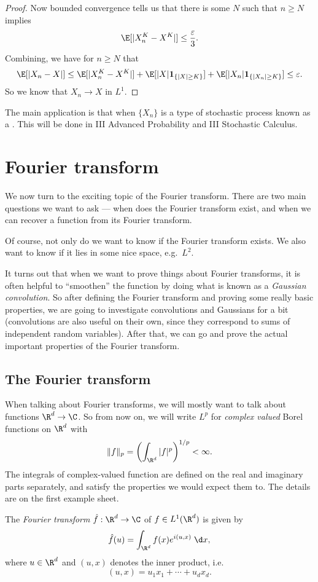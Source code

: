 \documentclass[a4paper]{article}
\begin{document}
\begin{proof}
  Now bounded convergence tells us that there is some $N$ such that $n \geq N$ implies
  \[
    \E[|X_n^K - X^K|] \leq \frac{\varepsilon}{3}.
  \]
  Combining, we have for $n \geq N$ that
  \[
    \E[|X_n - X|] \leq \E[|X_n^K - X^K|] + \E[|X|\mathbf{1}_{\{|X| \geq K\}}] + \E[|X_n|\mathbf{1}_{\{|X_n| \geq K\}}] \leq \varepsilon.
  \]
  So we know that $X_n \to X$ in $L^1$.
\end{proof}

The main application is that when $\{X_n\}$ is a type of stochastic process known as a . This will be done in III Advanced Probability and III Stochastic Calculus.

\section{Fourier transform}
We now turn to the exciting topic of the Fourier transform. There are two main questions we want to ask --- when does the Fourier transform exist, and when we can recover a function from its Fourier transform.

Of course, not only do we want to know if the Fourier transform exists. We also want to know if it lies in some nice space, e.g.\ $L^2$.

It turns out that when we want to prove things about Fourier transforms, it is often helpful to ``smoothen'' the function by doing what is known as a \emph{Gaussian convolution}. So after defining the Fourier transform and proving some really basic properties, we are going to investigate convolutions and Gaussians for a bit (convolutions are also useful on their own, since they correspond to sums of independent random variables). After that, we can go and prove the actual important properties of the Fourier transform.

\subsection{The Fourier transform}
When talking about Fourier transforms, we will mostly want to talk about functions $\R^d \to \C$. So from now on, we will write $L^p$ for \emph{complex valued} Borel functions on $\R^d$ with
\[
  \|f\|_p = \left(\int_{\R^d} |f|^p\right)^{1/p} < \infty.
\]
The integrals of complex-valued function are defined on the real and imaginary parts separately, and satisfy the properties we would expect them to. The details are on the first example sheet.

\begin{defi}
  The \emph{Fourier transform} $\hat{f}: \R^d \to \C$ of $f \in L^1(\R^d)$ is given by
  \[
    \hat{f}(u) = \int_{\R^d}f(x) e^{i (u, x)}\;\d x,
  \]
  where $u \in \R^d$ and $(u, x)$ denotes the inner product, i.e.
  \[
    (u, x) = u_1 x_1 + \cdots + u_d x_d.
  \]
\end{defi}
\end{document}
